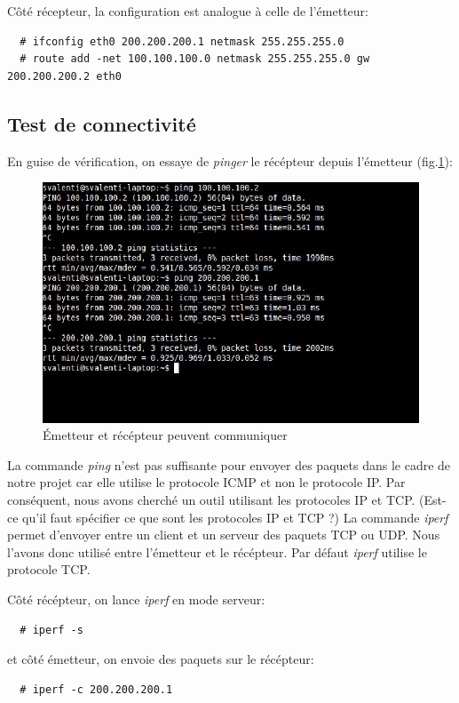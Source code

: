 \documentclass[a4paper]{article}
\begin{document}
Côté récepteur, la configuration est analogue à celle de l'émetteur:
\begin{verbatim}
  # ifconfig eth0 200.200.200.1 netmask 255.255.255.0
  # route add -net 100.100.100.0 netmask 255.255.255.0 gw 200.200.200.2 eth0
\end{verbatim}

\subsection{Test de connectivité}
En guise de vérification, on essaye de \textit{pinger} le
récépteur depuis l'émetteur (fig.\ref{ping}):
\begin{figure}
	\centering
	\includegraphics[scale=.5]{ping.jpg}
	\caption{\label{ping} Émetteur et récépteur peuvent communiquer}
\end{figure}

La commande \textit{ping} n'est pas suffisante pour envoyer
des paquets dans le cadre de notre projet car elle utilise
le protocole ICMP et non le protocole IP. Par conséquent,
nous avons cherché un outil utilisant les protocoles IP et TCP.
(Est-ce qu’il faut spécifier ce que sont les protocoles IP et TCP ?)
La commande \textit{iperf} permet d'envoyer entre un client et
un serveur des paquets TCP ou UDP. Nous l'avons donc utilisé
entre l'émetteur et le récépteur. Par défaut \textit{iperf}
utilise le protocole TCP.

Côté récépteur, on lance \textit{iperf} en mode serveur:
\begin{verbatim}
  # iperf -s
\end{verbatim}

et côté émetteur, on envoie des paquets sur le récépteur:
\begin{verbatim}
  # iperf -c 200.200.200.1
\end{verbatim}
\end{document}

